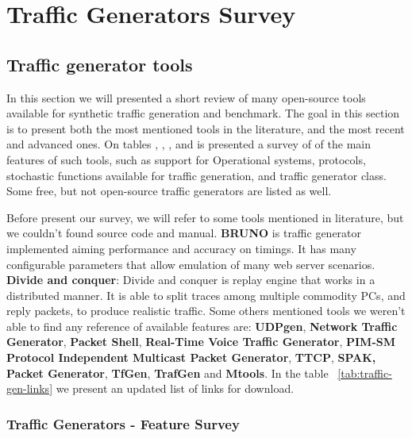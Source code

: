 \chapter{Traffic Generators Survey}
\label{ap:traffic-gen-survey}


\section{Traffic generator tools}


In this section we will presented a short review of many open-source tools available for synthetic traffic generation and benchmark. The goal in this section is to present both the most mentioned tools in the literature, and the most recent and advanced ones. On tables \label{tab:packet-level-tg}, \label{tab:multi-level-tg}, \label{tab:app-level-tg}, and \label{tab:replay-tg} is presented a survey of of the main features of such tools, such as support for Operational systems, protocols, stochastic functions available for traffic generation, and traffic generator class. Some free, but not open-source traffic generators are listed as well. 

Before present our survey, we will refer to some tools mentioned in literature, but we couldn't found source code and manual. \textbf{BRUNO}\cite{bruno-paper} is traffic generator implemented aiming performance and accuracy on timings. It has many configurable parameters that allow emulation of many web server scenarios. \textbf{Divide and conquer}\cite{validate-trafficgen}: Divide and conquer is replay engine that works in a distributed manner. It is able to split traces among multiple commodity PCs, and reply packets, to produce realistic traffic. Some others mentioned tools\cite{web-ditg} we weren't able to find any reference of available features are: \textbf{UDPgen}, \textbf{Network Traffic Generator}, \textbf{Packet Shell}, \textbf{Real-Time Voice Traffic Generator}, \textbf{PIM-SM Protocol Independent Multicast Packet Generator}, \textbf{TTCP}, \textbf{SPAK, Packet Generator}, \textbf{TfGen}, \textbf{TrafGen} and \textbf{Mtools}. In the table ~\ref{tab:traffic-gen-links} we present an updated list of links for download.

\subsection{Traffic Generators - Feature Survey}


